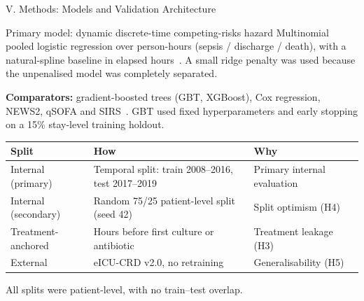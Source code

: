 \begin{frame}{V. Methods: Models and Validation Architecture}
\begin{block}{Primary model: dynamic discrete-time competing-risks hazard}
  \footnotesize Multinomial pooled logistic regression over person-hours
  (sepsis / discharge / death), with a natural-spline baseline in elapsed
  hours~\cite{dagostino1990pooled,heyard2019dynamic}. A small ridge penalty
  was used because the unpenalised model was completely separated.
\end{block}

\vspace{2pt}
{\footnotesize\textbf{Comparators:} gradient-boosted trees (GBT, XGBoost), Cox
regression, NEWS2, qSOFA and SIRS~\cite{evans2021ssc}. GBT used fixed
hyperparameters and early stopping on a 15\% stay-level training holdout.\par}

\vspace{4pt}
\begin{center}\renewcommand{\arraystretch}{1.12}\scriptsize
\begin{tabular}{p{2.7cm}p{6.6cm}p{3.6cm}}
\toprule
\textbf{Split} & \textbf{How} & \textbf{Why} \\
\midrule
Internal (primary)   & Temporal split: train 2008--2016, test 2017--2019~\cite{guo2022temporal} & Primary internal evaluation \\
Internal (secondary) & Random 75/25 patient-level split (seed 42)                    & Split optimism (H4) \\
Treatment-anchored   & Hours before first culture or antibiotic~\cite{kamran2024evaluation} & Treatment leakage (H3) \\
External             & eICU-CRD v2.0, no retraining~\cite{pollard2018eicu}           & Generalisability (H5) \\
\bottomrule
\end{tabular}
\end{center}
{\scriptsize All splits were patient-level, with no train--test overlap.\par}
\end{frame}


